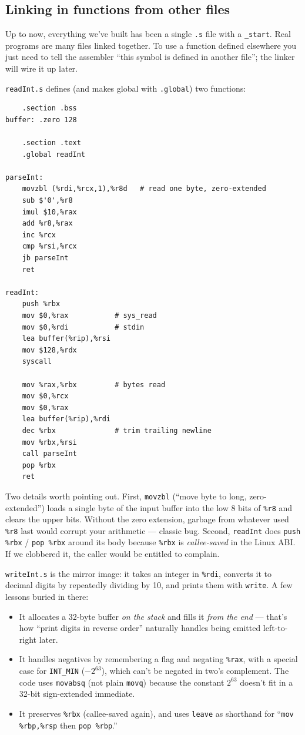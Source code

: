 \documentclass[11pt]{article}
\begin{document}
\subsection*{Linking in functions from other files}

Up to now, everything we've built has been a single \texttt{.s} file
with a \texttt{\_start}. Real programs are many files linked
together. To use a function defined elsewhere you just need to tell
the assembler ``this symbol is defined in another file''; the linker
will wire it up later.

\texttt{readInt.s} defines (and makes global with \texttt{.global})
two functions:

\begin{lstlisting}
    .section .bss
buffer: .zero 128

    .section .text
    .global readInt

parseInt:
    movzbl (%rdi,%rcx,1),%r8d   # read one byte, zero-extended
    sub $'0',%r8
    imul $10,%rax
    add %r8,%rax
    inc %rcx
    cmp %rsi,%rcx
    jb parseInt
    ret

readInt:
    push %rbx
    mov $0,%rax           # sys_read
    mov $0,%rdi           # stdin
    lea buffer(%rip),%rsi
    mov $128,%rdx
    syscall

    mov %rax,%rbx         # bytes read
    mov $0,%rcx
    mov $0,%rax
    lea buffer(%rip),%rdi
    dec %rbx              # trim trailing newline
    mov %rbx,%rsi
    call parseInt
    pop %rbx
    ret
\end{lstlisting}

Two details worth pointing out. First, \texttt{movzbl} (``move byte
to long, zero-extended'') loads a single byte of the input buffer
into the low 8 bits of \texttt{\%r8} and clears the upper bits.
Without the zero extension, garbage from whatever used \texttt{\%r8}
last would corrupt your arithmetic --- classic bug. Second,
\texttt{readInt} does \texttt{push \%rbx} / \texttt{pop \%rbx}
around its body because \texttt{\%rbx} is \emph{callee-saved} in the
Linux ABI. If we clobbered it, the caller would be entitled to
complain.

\texttt{writeInt.s} is the mirror image: it takes an integer in
\texttt{\%rdi}, converts it to decimal digits by repeatedly dividing
by 10, and prints them with \texttt{write}. A few lessons buried in
there:
\begin{itemize}
  \item It allocates a 32-byte buffer \emph{on the stack} and fills
    it \emph{from the end} --- that's how ``print digits in reverse
    order'' naturally handles being emitted left-to-right later.
  \item It handles negatives by remembering a flag and negating
    \texttt{\%rax}, with a special case for \texttt{INT\_MIN}
    ($-2^{63}$), which can't be negated in two's complement. The code
    uses \texttt{movabsq} (not plain \texttt{movq}) because the
    constant $2^{63}$ doesn't fit in a 32-bit sign-extended
    immediate.
  \item It preserves \texttt{\%rbx} (callee-saved again), and uses
    \texttt{leave} as shorthand for ``\texttt{mov \%rbp,\%rsp} then
    \texttt{pop \%rbp}.''
\end{itemize}
\end{document}
